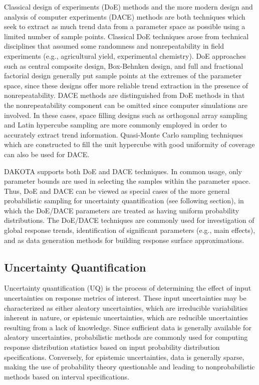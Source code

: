 Classical design of experiments (DoE) methods and the more modern
design and analysis of computer experiments (DACE) methods are both
techniques which seek to extract as much trend data from a parameter
space as possible using a limited number of sample points. Classical
DoE techniques arose from technical disciplines that assumed some
randomness and nonrepeatability in field experiments (e.g.,
agricultural yield, experimental chemistry). DoE approaches such as
central composite design, Box-Behnken design, and full and fractional
factorial design generally put sample points at the extremes of the
parameter space, since these designs offer more reliable trend
extraction in the presence of nonrepeatability. DACE methods are
distinguished from DoE methods in that the nonrepeatability component
can be omitted since computer simulations are involved. In these
cases, space filling designs such as orthogonal array sampling and
Latin hypercube sampling are more commonly employed in order to
accurately extract trend information. Quasi-Monte Carlo sampling 
techniques which are constructed to fill the unit hypercube with 
good uniformity of coverage can also be used for DACE.

DAKOTA supports both DoE and DACE techniques. In common usage, only
parameter bounds are used in selecting the samples within the
parameter space. Thus, DoE and DACE can be viewed as special cases of
the more general probabilistic sampling for uncertainty quantification
(see following section), in which the DoE/DACE parameters are treated
as having uniform probability distributions. The DoE/DACE techniques
are commonly used for investigation of global response trends,
identification of significant parameters (e.g., main effects), and as
data generation methods for building response surface approximations.

\subsection{Uncertainty Quantification}\label{introduction:background:uncertainty}

Uncertainty quantification (UQ) is the process of determining the
effect of input uncertainties on response metrics of interest.  These
input uncertainties may be characterized as either aleatory
uncertainties, which are irreducible variabilities inherent in nature,
or epistemic uncertainties, which are reducible uncertainties
resulting from a lack of knowledge.  Since sufficient data is
generally available for aleatory uncertainties, probabilistic methods
are commonly used for computing response distribution statistics based
on input probability distribution specifications.  Conversely, for
epistemic uncertainties, data is generally sparse, making the use of
probability theory questionable and leading to nonprobabilistic
methods based on interval specifications.

